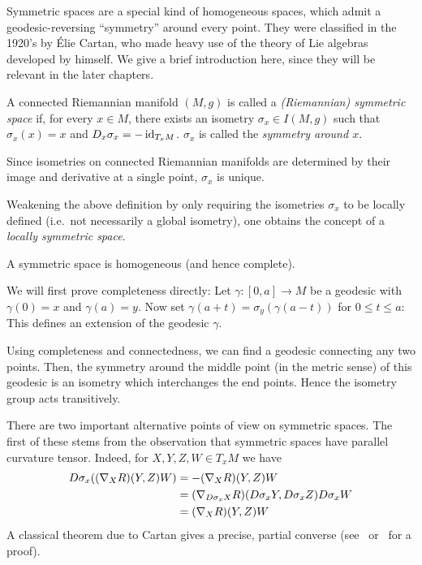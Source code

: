 Symmetric spaces are a special kind of homogeneous spaces, which admit a geodesic-reversing ``symmetry'' around every point. They were classified in the 1920's by \'Elie Cartan, who made heavy use of the theory of Lie algebras developed by himself. We give a brief introduction here, since they will be relevant in the later chapters.

\begin{mydef}
	A connected Riemannian manifold $(M,g)$ is called a \emph{(Riemannian) symmetric space} if, for every $x\in M$, there exists an isometry $\sigma_x\in I(M,g)$ such that $\sigma_x(x)=x$ and $D_x \sigma_x=-\operatorname{id}_{T_xM}$. $\sigma_x$ is called the \emph{symmetry around $x$}.
\end{mydef}

\begin{rem}\leavevmode
	\begin{numberedlist}
		\item Since isometries on connected Riemannian manifolds are determined by their image and derivative at a single point, $\sigma_x$ is unique.
		\item Weakening the above definition by only requiring the isometries $\sigma_x$ to be locally defined (i.e.~not necessarily a global isometry), one obtains the concept of a \emph{locally symmetric space}.
	\end{numberedlist}
\end{rem}

\begin{prop}
	A symmetric space is homogeneous (and hence complete).
\end{prop}
\begin{myproof}
	We will first prove completeness directly: Let $\gamma:[0,a]\to M$ be a geodesic with $\gamma(0)=x$ and $\gamma(a)=y$. Now set $\gamma(a+t)=\sigma_y(\gamma(a-t))$ for $0\leq t\leq a$: This defines an extension of the geodesic $\gamma$.
	
	Using completeness and connectedness, we can find a geodesic connecting any two points. Then, the symmetry around the middle point (in the metric sense) of this geodesic is an isometry which interchanges the end points. Hence the isometry group acts transitively.
\end{myproof}

There are two important alternative points of view on symmetric spaces. The first of these stems from the observation that symmetric spaces have parallel curvature tensor. Indeed, for $X,Y,Z,W\in T_x M$ we have 
\begin{align*}
	D \sigma_x((\nabla_X R)(Y,Z)W)
	&=-(\nabla_X R)(Y,Z)W\\
	&=(\nabla_{D\sigma_x X}R)(D \sigma_x Y,D \sigma_x Z)D \sigma_x W\\
	&=(\nabla_X R)(Y,Z)W
\end{align*}
A classical theorem due to Cartan gives a precise, partial converse (see~\cite{Pet2016} or~\cite{Hel1978} for a proof).

